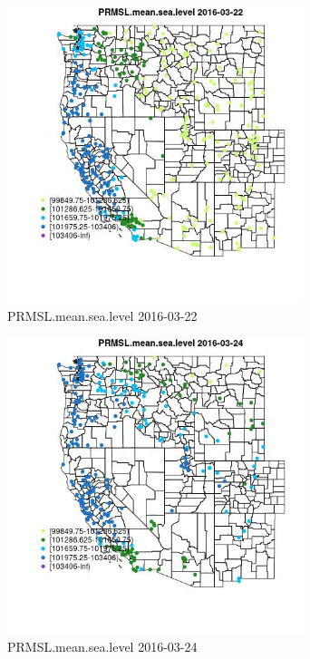 \begin{figure} 
\centering  
\includegraphics[width=0.77\textwidth]{Code_Outputs/Report_ML_input_PM25_Step4_part_e_de_duplicated_aveswNAs_MapObsPRMSLmeansealevel2016-03-22.jpg} 
\caption{\label{fig:Report_ML_input_PM25_Step4_part_e_de_duplicated_aveswNAsMapObsPRMSLmeansealevel2016-03-22}PRMSL.mean.sea.level 2016-03-22} 
\end{figure} 
 

\begin{figure} 
\centering  
\includegraphics[width=0.77\textwidth]{Code_Outputs/Report_ML_input_PM25_Step4_part_e_de_duplicated_aveswNAs_MapObsPRMSLmeansealevel2016-03-24.jpg} 
\caption{\label{fig:Report_ML_input_PM25_Step4_part_e_de_duplicated_aveswNAsMapObsPRMSLmeansealevel2016-03-24}PRMSL.mean.sea.level 2016-03-24} 
\end{figure} 
 

